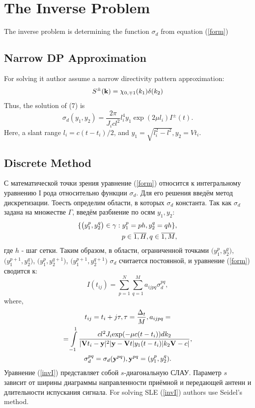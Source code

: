 \documentclass{procDDs}
\begin{document}
\section{The Inverse Problem}
The inverse problem is determining the function $\sigma_d$ from equation (\ref{form})
\subsection{Narrow DP Approximation}
 For solving it author assume a narrow directivity pattern approximation:
\begin{equation}
S^{\pm}(\mathbf{k}) = \chi_{0,\mp1}(k_1)\delta(k_2)
\end{equation}
Thus, the solution of (7) is
\begin{equation}
	\label{sigma_form}
	\sigma_d \left( y_1, y_2 \right) = \frac{2\pi}{J_icl^2} l_i^4 y_1 \exp(2\mu l_i)I^\pm(t).
\end{equation}
Here, a slant range $l_i=c(t-t_i)/2$, and $y_1=\sqrt{l_i^2-l^2}, y_2=Vt_i$.

\subsection{Discrete Method}
С математической точки зрения уравнение (\ref{form}) относится к интегральному уравнению I рода относительно функции $\sigma_d$. Для его решения введём метод дискретизации. Тоесть определим области, в которых $\sigma_d$  константа. Так как $\sigma_d$ задана на множестве $\Gamma$, введём разбиение по осям $y_1, y_2$:
\begin{align}
	\{ \big( y_1^p, y_2^q \big) \in\gamma: y_1^p = ph, y_2^q = qh \}, \notag \\ 
	p \in \overline{1, H}, q \in \overline{1, M}, 
\end{align}
где $h$ - шаг сетки. Таким образом, в области, ограниченной точками $\big(y_1^p, y_2^q\big)$, $\big(y_1^{p+1}, y_2^q\big)$, $\big(y_1^p, y_2^{q+1}\big)$, $\big(y_1^{p+1}, y_2^{q+1}\big)$ $\sigma_d$ считается постоянной, и уравнение (\ref{form}) сводится к:
\begin{equation}
\label{invI}
	I(t_{ij}) = \sum \limits_{p=1}^{N} \sum \limits_{q=1}^{M} a_{ijpq}\sigma_d^{pq},
\end{equation}
where,
\begin{multline*}
t_{ij} = t_i+j\tau, \tau = \frac{\Delta_t}{M}, a_{ijpq} = \\ 
=  \int\limits_{-1}^{1}
\frac{cl^2J_i \text{exp}(-\mu c(t-t_i))dk_2}{|\mathbf{V}t_i-\mathbf{y}|^2|\mathbf{y}-\mathbf{V}t|y_1(t-t_i)|k_2 \mathbf{V}-c|}, \\
\sigma_d^{pq} = \sigma_d(\textbf{y}^{pq}), \textbf{y}^{pq} = (y_1^p, y_2^q).
\end{multline*}
Уравнение (\ref{invI}) представляет собой $s$-диагональную СЛАУ. Параметр $s$ зависит от ширины диаграммы направленности приёмной и передающей антенн и длительности испускания сигнала. For solving SLE (\ref{invI}) authors use  Seidel's method.
\end{document}

